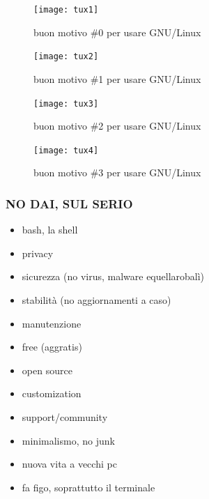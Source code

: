 \documentclass{beamer}
\begin{document}
\begin{frame}
\end{frame}
\begin{frame}
    \begin{figure}
        \texttt{[image: tux1]}
        \caption{buon motivo \#0 per usare GNU/Linux}
    \end{figure}
\end{frame}
\begin{frame}
    \begin{figure}
        \texttt{[image: tux2]}
        \caption{buon motivo \#1 per usare GNU/Linux}
    \end{figure}
\end{frame}
\begin{frame}
    \begin{figure}
        \texttt{[image: tux3]}
        \caption{buon motivo \#2 per usare GNU/Linux}
    \end{figure}
\end{frame}
\begin{frame}
    \begin{figure}
        \texttt{[image: tux4]}
        \caption{buon motivo \#3 per usare GNU/Linux}
    \end{figure}
\end{frame}

\begin{frame}
    \frametitle{NO DAI, SUL SERIO}
        \begin{itemize}
            \item bash, la shell
            \item privacy
            \item sicurezza (no virus, malware equellarobalì)
            \item stabilità (no aggiornamenti a caso)
            \item manutenzione
            \item free (aggratis)
            \item open source
            \item customization
            \item support/community
            \item minimalismo, no junk
            \item nuova vita a vecchi pc 
            \item fa figo, soprattutto il terminale
        \end{itemize}
\end{frame}
\end{document}
